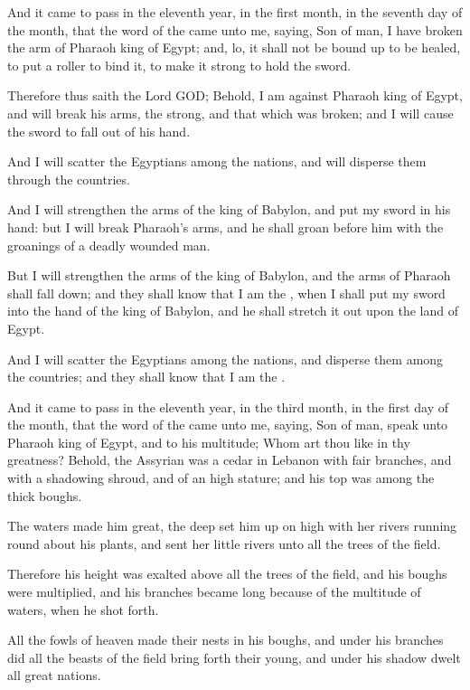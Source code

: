 \Verse And it came to pass in the eleventh year, in the first month, in the seventh day of the month, that the word of the \LORD came unto me, saying, \Verse Son of man, I have broken the arm of Pharaoh king of Egypt; and, lo, it shall not be bound up to be healed, to put a roller to bind it, to make it strong to hold the sword.

\Verse Therefore thus saith the Lord GOD; Behold, I am against Pharaoh king of Egypt, and will break his arms, the strong, and that which was broken; and I will cause the sword to fall out of his hand.

\Verse And I will scatter the Egyptians among the nations, and will disperse them through the countries.

\Verse And I will strengthen the arms of the king of Babylon, and put my sword in his hand: but I will break Pharaoh's arms, and he shall groan before him with the groanings of a deadly wounded man.

\Verse But I will strengthen the arms of the king of Babylon, and the arms of Pharaoh shall fall down; and they shall know that I am the \LORD, when I shall put my sword into the hand of the king of Babylon, and he shall stretch it out upon the land of Egypt.

\Verse And I will scatter the Egyptians among the nations, and disperse them among the countries; and they shall know that I am the \LORD.


\Chapter
\Verse And it came to pass in the eleventh year, in the third month, in the first day of the month, that the word of the \LORD came unto me, saying, \Verse Son of man, speak unto Pharaoh king of Egypt, and to his multitude; Whom art thou like in thy greatness?  \Verse Behold, the Assyrian was a cedar in Lebanon with fair branches, and with a shadowing shroud, and of an high stature; and his top was among the thick boughs.

\Verse The waters made him great, the deep set him up on high with her rivers running round about his plants, and sent her little rivers unto all the trees of the field.

\Verse Therefore his height was exalted above all the trees of the field, and his boughs were multiplied, and his branches became long because of the multitude of waters, when he shot forth.

\Verse All the fowls of heaven made their nests in his boughs, and under his branches did all the beasts of the field bring forth their young, and under his shadow dwelt all great nations.

